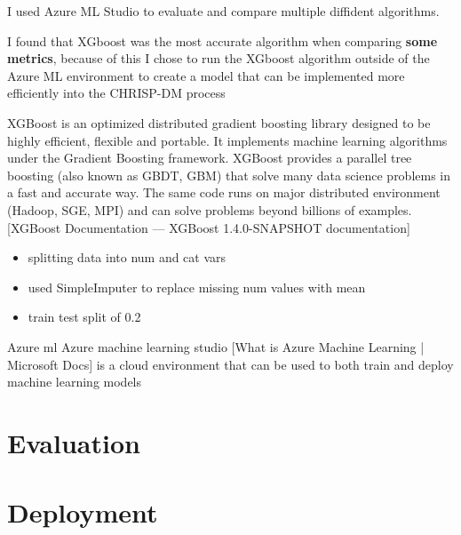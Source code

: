 I used Azure ML Studio to evaluate and compare multiple diffident algorithms. 

I found that XGboost was the most accurate algorithm when comparing \textbf{some metrics}, because of this I chose to run the XGboost algorithm outside of the Azure ML environment to create a model that can be implemented more efficiently into the CHRISP-DM process

XGBoost is an optimized distributed gradient boosting library designed to be highly efficient, flexible and portable. It implements machine learning algorithms under the Gradient Boosting framework. XGBoost provides a parallel tree boosting (also known as GBDT, GBM) that solve many data science problems in a fast and accurate way. The same code runs on major distributed environment (Hadoop, SGE, MPI) and can solve problems beyond billions of examples. [XGBoost Documentation — XGBoost 1.4.0-SNAPSHOT documentation]

\begin{itemize}
\item splitting data into num and cat vars 
\item used SimpleImputer to replace missing num values with mean
\item train test split of 0.2
\end{itemize}

			 
Azure ml
Azure machine learning studio [What is Azure Machine Learning | Microsoft Docs] is a cloud environment that can be used to both train and deploy machine learning models 


\section{Evaluation}

\section{Deployment}


